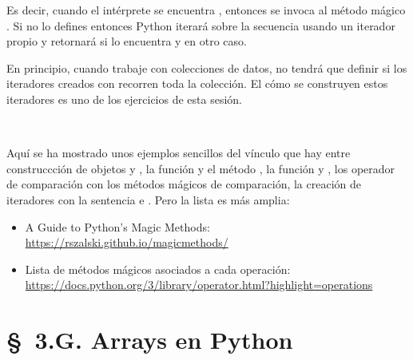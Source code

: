 \begin{itemize}
Es decir, cuando el intérprete se encuentra , entonces se invoca 
al método mágico . Si no lo defines entonces Python iterará sobre la secuencia
usando un iterador propio y retornará  si lo encuentra y  en otro caso. 

En principio, cuando trabaje con colecciones de datos, no tendrá que definir   si los iteradores creados con  recorren toda la colección. El cómo se construyen estos iteradores es uno de los ejercicios de esta sesión.






\end{itemize}

\

Aquí se ha mostrado unos ejemplos sencillos del vínculo que hay entre construccción de objetos y  , la función  y el método , la función   y  , los operador de comparación con los métodos mágicos de comparación, la creación de iteradores con la sentencia  e . Pero la lista es más amplia:
\begin{itemize}
\item A Guide to Python's Magic Methods: \url{https://rszalski.github.io/magicmethods/}
\item Lista de métodos mágicos asociados a cada operación: \url{https://docs.python.org/3/library/operator.html?highlight=operations}
\end{itemize}







\section*{\S \ 3.G. Arrays en Python}





